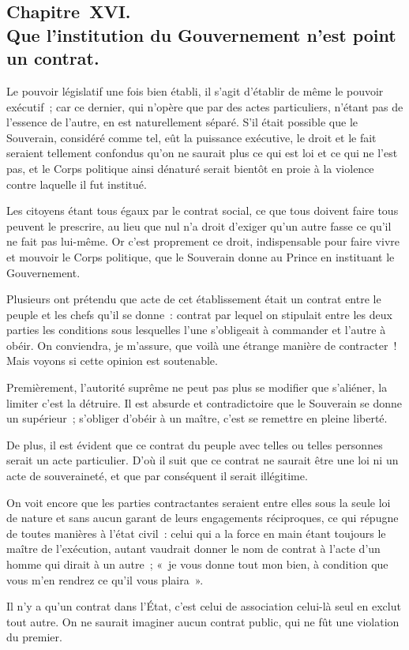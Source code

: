 \documentclass[french,twoside]{book} %
\begin{document}
\subsection[{Chapitre XVI. Que l’institution du Gouvernement n’est point un contrat.}]{Chapitre XVI. \\
Que l’institution du Gouvernement n’est point un contrat.}
\noindent Le pouvoir législatif une fois bien établi, il s’agit d’établir de même le pouvoir exécutif ; car ce dernier, qui n’opère que par des actes particuliers, n’étant pas de l’essence de l’autre, en est naturellement séparé. S’il était possible que le Souverain, considéré comme tel, eût la puissance exécutive, le droit et le fait seraient tellement confondus qu’on ne saurait plus ce qui est loi et ce qui ne l’est pas, et le Corps politique ainsi dénaturé serait bientôt en proie à la violence contre laquelle il fut institué.\par
Les citoyens étant tous égaux par le contrat social, ce que tous doivent faire tous peuvent le prescrire, au lieu que nul n’a droit d’exiger qu’un autre fasse ce qu’il ne fait pas lui-même. Or c’est proprement ce droit, indispensable pour faire vivre et mouvoir le Corps politique, que le Souverain donne au Prince en instituant le Gouvernement.\par
Plusieurs ont prétendu que acte de cet établissement était un contrat entre le peuple et les chefs qu’il se donne : contrat par lequel on stipulait entre les deux parties les conditions sous lesquelles l’une s’obligeait à commander et l’autre à obéir. On conviendra, je m’assure, que voilà une étrange manière de contracter ! Mais voyons si cette opinion est soutenable.\par
Premièrement, l’autorité suprême ne peut pas plus se modifier que s’aliéner, la limiter c’est la détruire. Il est absurde et contradictoire que le Souverain se donne un supérieur ; s’obliger d’obéir à un maître, c’est se remettre en pleine liberté.\par
De plus, il est évident que ce contrat du peuple avec telles ou telles personnes serait un acte particulier. D’où il suit que ce contrat ne saurait être une loi ni un acte de souveraineté, et que par conséquent il serait illégitime.\par
On voit encore que les parties contractantes seraient entre elles sous la seule loi de nature et sans aucun garant de leurs engagements réciproques, ce qui répugne de toutes manières à l’état civil : celui qui a la force en main étant toujours le maître de l’exécution, autant vaudrait donner le nom de contrat à l’acte d’un homme qui dirait à un autre ; « je vous donne tout mon bien, à condition que vous m’en rendrez ce qu’il vous plaira ».\par
Il n’y a qu’un contrat dans l’État, c’est celui de association celui-là seul en exclut tout autre. On ne saurait imaginer aucun contrat public, qui ne fût une violation du premier.
\end{document}
